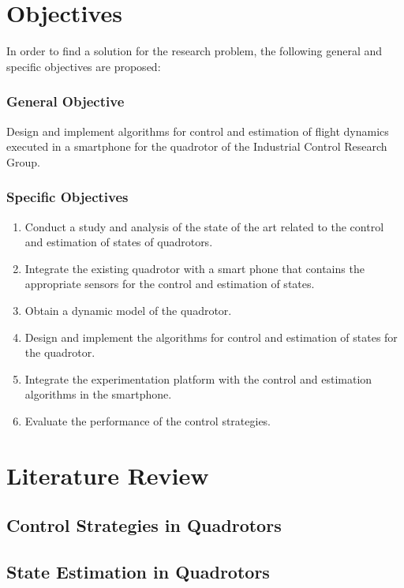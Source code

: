 \section{Objectives}
In order to find a solution for the research problem, the following general and specific objectives are proposed:
\subsubsection{General Objective}
Design and implement algorithms for control and estimation of flight dynamics executed in a smartphone for the quadrotor of the Industrial Control Research Group.
\subsubsection{Specific Objectives}
\begin{enumerate}
\item Conduct a study and analysis of the state of the art related to the control and estimation of states of quadrotors.
\item Integrate the existing quadrotor with a smart phone that contains the appropriate sensors for the control and estimation of states.
\item Obtain a dynamic model of the quadrotor.
\item Design and implement the algorithms for control and estimation of states for the quadrotor.
\item Integrate the experimentation platform with the control and estimation algorithms in the smartphone.
\item Evaluate the performance of the control strategies.%
\end{enumerate}

\section{Literature Review}

\subsection{Control Strategies in Quadrotors}


\subsection{State Estimation in Quadrotors}


